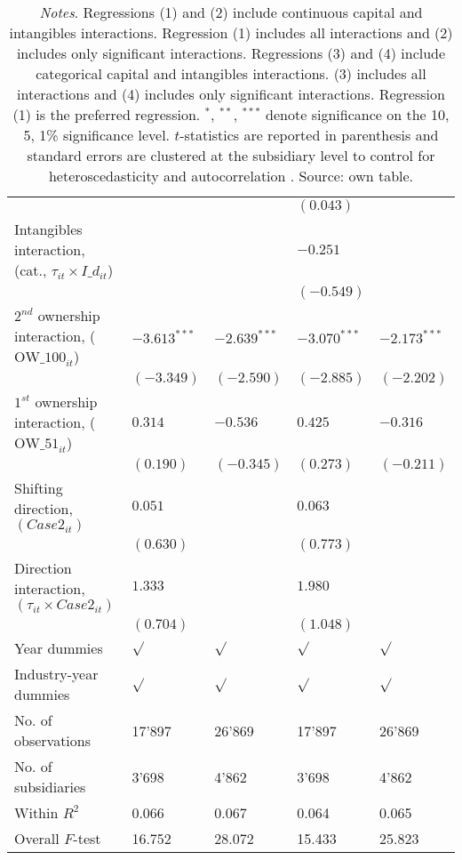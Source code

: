 \documentclass[10pt,twocolumn,oneside,cmyk]{article}
\begin{document}
\begin{table*}[t]
\begin{center}
\begin{tabularx}{0.75\textwidth}{l *{4}{Y}}
    & & &$(0.043)$ \\
    Intangibles interaction, (cat., $\tau_{it}\times I\_d_{it}$)& & &$-0.251$\\
    & & &$(-0.549)$\\
    $2^{nd}$ ownership interaction, ($\text{OW\_100}_{it}$) &$-3.613^{***}$ &$-2.639^{***}$ &$-3.070^{***}$ &$-2.173^{***}$\\
    &$(-3.349)$ &$(-2.590)$ &$(-2.885)$ &$(-2.202)$\\
    $1^{st}$ ownership interaction, ($\text{OW\_51}_{it}$) &$0.314$ &$-0.536$ &$0.425$ &$-0.316$\\
    &$(0.190)$ &$(-0.345)$ &$(0.273)$ &$(-0.211)$\\
    Shifting direction, $(Case2_{it})$ &$0.051$ & &$0.063$\\
    &$(0.630)$ & &$(0.773)$\\
    Direction interaction, $(\tau_{it}\times Case2_{it})$ &$1.333$ & &$1.980$\\
    &$(0.704)$ & &$(1.048)$\\
    Year dummies &$\sqrt{}$ &$\sqrt{}$ &$\sqrt{}$ &$\sqrt{}$\\
    Industry-year dummies &$\sqrt{}$ &$\sqrt{}$ &$\sqrt{}$ &$\sqrt{}$ \\
    No. of observations &17'897 &26'869 &17'897 &26'869\\
    No. of subsidiaries &3'698 &4'862 &3'698 &4'862\\
    Within $R^2$ &0.066 &0.067 &0.064 &0.065\\
    Overall $F$-test &16.752 &28.072 &15.433 &25.823\\
    \bottomrule
   \end{tabularx}
  \caption*{\footnotesize{\textit{Notes}. Regressions (1) and (2) include continuous capital and intangibles interactions. Regression (1) includes all interactions and (2) includes only significant interactions. Regressions (3) and (4) include categorical capital and intangibles interactions. (3) includes all interactions and (4) includes only significant interactions. Regression (1) is the preferred regression. $^*$, $^{**}$, $^{***}$ denote significance on the 10, 5, 1\% significance level. $t$-statistics are reported in parenthesis and standard errors are clustered at the subsidiary level to control for heteroscedasticity and autocorrelation \parencite[285]{hoechle_robust_2007}. Source: own table.}}
 \end{center}
\end{table*}
\end{document}
